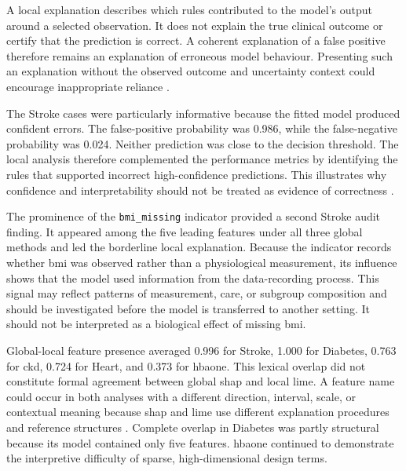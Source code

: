 A local explanation describes which rules contributed to the model's output around a selected observation. It does not explain the true clinical outcome or certify that the prediction is correct. A coherent explanation of a false positive therefore remains an explanation of erroneous model behaviour. Presenting such an explanation without the observed outcome and uncertainty context could encourage inappropriate reliance \citep{ribeiro_why_2016, vilone_classification_2021, vasconcelos_explanations_2023, lee_understanding_2023}.

The Stroke cases were particularly informative because the fitted model produced confident errors. The false-positive probability was 0.986, while the false-negative probability was 0.024. Neither prediction was close to the decision threshold. The local analysis therefore complemented the performance metrics by identifying the rules that supported incorrect high-confidence predictions. This illustrates why confidence and interpretability should not be treated as evidence of correctness \citep{vasconcelos_explanations_2023, lee_understanding_2023}.

The prominence of the \texttt{bmi\_missing} indicator provided a second Stroke audit finding. It appeared among the five leading features under all three global methods and led the borderline local explanation. Because the indicator records whether \gls{bmi} was observed rather than a physiological measurement, its influence shows that the model used information from the data-recording process. This signal may reflect patterns of measurement, care, or subgroup composition and should be investigated before the model is transferred to another setting. It should not be interpreted as a biological effect of missing \gls{bmi}.

Global-local feature presence averaged 0.996 for Stroke, 1.000 for Diabetes, 0.763 for \gls{ckd}, 0.724 for Heart, and 0.373 for \gls{hbaone}. This lexical overlap did not constitute formal agreement between global \gls{shap} and local \gls{lime}. A feature name could occur in both analyses with a different direction, interval, scale, or contextual meaning because \gls{shap} and \gls{lime} use different explanation procedures and reference structures \citep{NIPS2017_8a20a862, ribeiro_why_2016, vilone_classification_2021}. Complete overlap in Diabetes was partly structural because its model contained only five features. \gls{hbaone} continued to demonstrate the interpretive difficulty of sparse, high-dimensional design terms.

